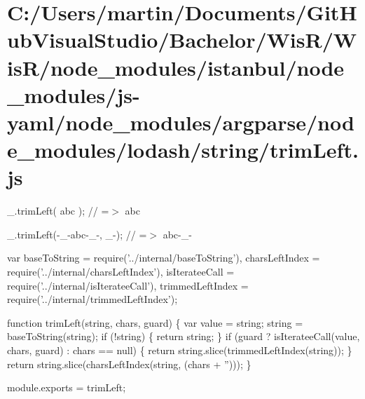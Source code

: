 \hypertarget{_c_1_2_users_2martin_2_documents_2_git_hub_visual_studio_2_bachelor_2_wis_r_2_wis_r_2node_modulef7a9d6696d60997b329b468af6a0c92e}{}\section{C\+:/\+Users/martin/\+Documents/\+Git\+Hub\+Visual\+Studio/\+Bachelor/\+Wis\+R/\+Wis\+R/node\+\_\+modules/istanbul/node\+\_\+modules/js-\/yaml/node\+\_\+modules/argparse/node\+\_\+modules/lodash/string/trim\+Left.\+js}
\+\_\+.\+trim\+Left(\textquotesingle{} abc \textquotesingle{}); // =$>$ \textquotesingle{}abc \textquotesingle{}

\+\_\+.\+trim\+Left(\textquotesingle{}-\/\+\_\+-\/abc-\/\+\_\+-\/\textquotesingle{}, \textquotesingle{}\+\_\+-\/\textquotesingle{}); // =$>$ \textquotesingle{}abc-\/\+\_\+-\/\textquotesingle{}


\begin{DoxyCodeInclude}
var baseToString = require(\textcolor{stringliteral}{'../internal/baseToString'}),
    charsLeftIndex = require(\textcolor{stringliteral}{'../internal/charsLeftIndex'}),
    isIterateeCall = require(\textcolor{stringliteral}{'../internal/isIterateeCall'}),
    trimmedLeftIndex = require(\textcolor{stringliteral}{'../internal/trimmedLeftIndex'});

\textcolor{keyword}{function} trimLeft(\textcolor{keywordtype}{string}, chars, guard) \{
  var value = string;
  \textcolor{keywordtype}{string} = baseToString(\textcolor{keywordtype}{string});
  \textcolor{keywordflow}{if} (!\textcolor{keywordtype}{string}) \{
    \textcolor{keywordflow}{return} string;
  \}
  \textcolor{keywordflow}{if} (guard ? isIterateeCall(value, chars, guard) : chars == null) \{
    \textcolor{keywordflow}{return} \textcolor{keywordtype}{string}.slice(trimmedLeftIndex(\textcolor{keywordtype}{string}));
  \}
  \textcolor{keywordflow}{return} \textcolor{keywordtype}{string}.slice(charsLeftIndex(\textcolor{keywordtype}{string}, (chars + \textcolor{stringliteral}{''})));
\}

module.exports = trimLeft;
\end{DoxyCodeInclude}
 